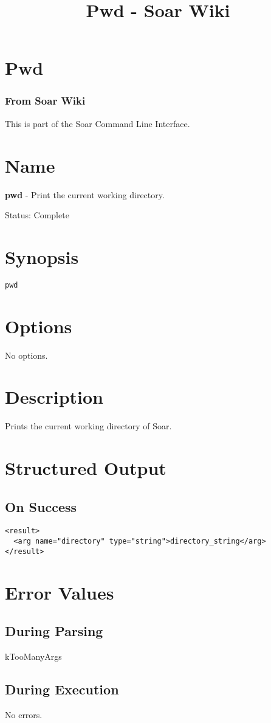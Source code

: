 \documentclass[10pt]{article}
\title{Pwd - Soar Wiki}
\begin{document}
\section*{Pwd}
\subsubsection*{From Soar Wiki}


 This is part of the Soar Command Line Interface. 
\section*{ Name }


 \textbf{pwd}
 - Print the current working directory. 


 Status: Complete
\section*{ Synopsis }
\begin{verbatim}
pwd

\end{verbatim}
\section*{ Options }


 No options. 
\section*{ Description }


 Prints the current working directory of Soar. 
\section*{ Structured Output }
\subsection*{ On Success }
\begin{verbatim}
<result>
  <arg name="directory" type="string">directory_string</arg>
</result>

\end{verbatim}
\section*{ Error Values }
\subsection*{ During Parsing }


 kTooManyArgs
\subsection*{ During Execution }


 No errors. 
\end{document}

